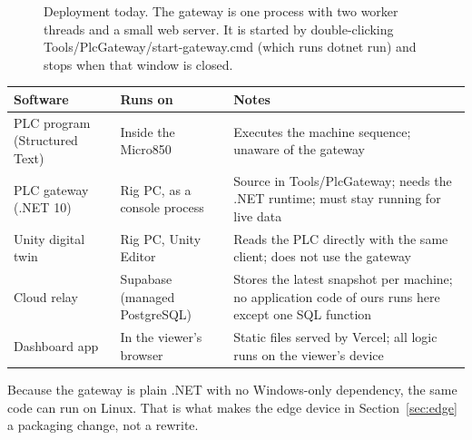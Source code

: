 \documentclass[a4paper,10.5pt]{article}
\newcommand{\code}[1]{{\ttfamily\small #1}}
\begin{document}
\begin{figure}[H]
\caption{Deployment today. The gateway is one process with two worker threads and a small web server. It is started by double-clicking \code{Tools/PlcGateway/start-gateway.cmd} (which runs \code{dotnet run}) and stops when that window is closed.}
\end{figure}

\begin{tabularx}{\textwidth}{@{}>{\raggedright\arraybackslash}p{36mm}>{\raggedright\arraybackslash}p{42mm}Y@{}}
\toprule
\textbf{Software} & \textbf{Runs on} & \textbf{Notes} \\
\midrule
PLC program (Structured Text) & Inside the Micro850 & Executes the machine sequence; unaware of the gateway \\
PLC gateway (.NET 10) & Rig PC, as a console process & Source in \code{Tools/PlcGateway}; needs the .NET runtime; must stay running for live data \\
Unity digital twin & Rig PC, Unity Editor & Reads the PLC directly with the same client; does not use the gateway \\
Cloud relay & Supabase (managed PostgreSQL) & Stores the latest snapshot per machine; no application code of ours runs here except one SQL function \\
Dashboard app & In the viewer's browser & Static files served by Vercel; all logic runs on the viewer's device \\
\bottomrule
\end{tabularx}

Because the gateway is plain .NET with no Windows-only dependency, the same code can run on Linux. That is
what makes the edge device in Section~\ref{sec:edge} a packaging change, not a rewrite.
\end{document}
